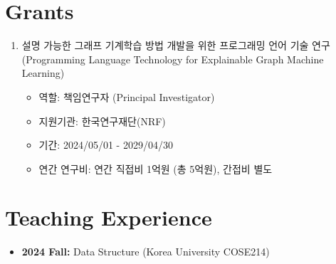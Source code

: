 \documentclass[letterpaper,11pt]{article}
\begin{document}
\section{Grants}
\begin{enumerate}
  \item{설명 가능한 그래프 기계학습 방법 개발을 위한 프로그래밍 언어 기술 연구 (Programming Language Technology for Explainable Graph Machine Learning)
  \begin{itemize}
    \item {역할: 책임연구자 (Principal Investigator)}
    \item {지원기관: 한국연구재단(NRF)}
    \item {기간: 2024/05/01 - 2029/04/30}
    \item {연간 연구비: 연간 직접비 1억원 (총 5억원), 간접비 별도}
  \end{itemize}
}
\end{enumerate}

\section{Teaching Experience}
\begin{itemize}
  \item{{\bf 2024 Fall:} Data Structure (Korea University COSE214)}
\end{itemize}


\end{document}

